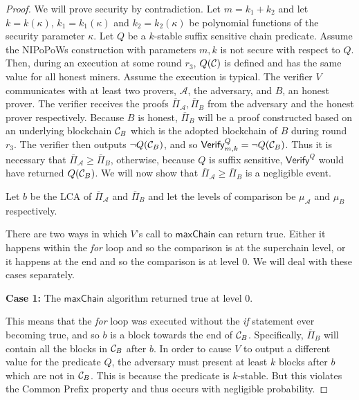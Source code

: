 \begin{proof}
    We will prove security by contradiction.  Let $m = k_1 + k_2$ and let $k =
    k(\kappa)$, $k_1 = k_1(\kappa)$ and $k_2 = k_2(\kappa)$ be polynomial
    functions of the security parameter $\kappa$.  Let $Q$ be a $k$-stable
    suffix sensitive chain predicate. Assume the NIPoPoWs construction with
    parameters $m, k$ is not secure with respect to $Q$. Then, during an
    execution at some round $r_3$, $Q(\mathcal{C})$ is defined and has the same
    value for all honest miners.  Assume the execution is typical. The verifier
    $V$ communicates with at least two provers, $\mathcal{A}$, the adversary,
    and $B$, an honest prover.  The verifier receives the proofs
    $\overline{\Pi}_\mathcal{A}, \overline{\Pi}_B$ from the adversary and the
    honest prover respectively.  Because $B$ is honest, $\overline{\Pi}_B$ will
    be a proof constructed based on an underlying blockchain $\mathcal{C}_B$ which
    is the adopted blockchain of $B$ during round $r_3$. The verifier then
    outputs $\lnot Q(\mathcal{C}_B)$, and so $\textsf{Verify}^Q_{m,k} = \lnot Q(\mathcal{C}_B)$.
    Thus it is
    necessary that $\overline{\Pi}_\mathcal{A} \geq
    \overline{\Pi}_B$, otherwise, because $Q$ is suffix
    sensitive, $\textsf{Verify}^Q$ would have returned $Q(\mathcal{C}_B)$. We will
    now show that $\overline{\Pi}_\mathcal{A} \geq
    \overline{\Pi}_B$ is a negligible event.

    Let $b$ be the LCA of $\overline{\Pi}_\mathcal{A}$ and $\overline{\Pi}_B$
    and let the levels of comparison be $\mu_\mathcal{A}$ and $\mu_B$
    respectively.

    There are
    two ways in which $V$'s call to $\textsf{maxChain}$ can return true. Either
    it happens within the \textit{for} loop and so the comparison is at the
    superchain level, or it happens at the end and so the comparison is at
    level $0$. We will deal with these cases separately.

    \textbf{Case 1:} The $\textsf{maxChain}$ algorithm returned true at level
    $0$.

    This means that the \textit{for} loop was executed without the \textit{if}
    statement ever becoming true, and so $b$ is a block towards the end of
    $\mathcal{C}_B$. Specifically, $\overline{\Pi}_B$ will contain all the blocks in
    $\mathcal{C}_B$ after $b$. In order to cause $V$ to output a different value for
    the predicate $Q$, the adversary must present at least $k$ blocks after $b$
    which are not in $\mathcal{C}_B$. This is because the predicate is $k$-stable.
    But this violates the Common Prefix property and thus occurs with
    negligible probability.


\end{proof}
